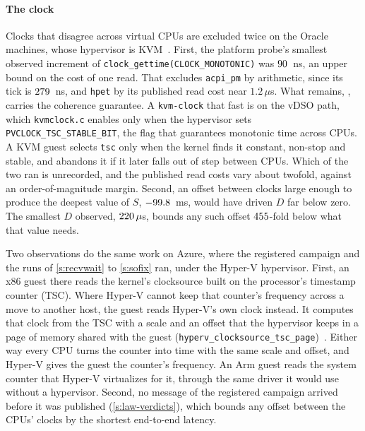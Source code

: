 \documentclass[10pt,journal,onecolumn]{IEEEtran}
\begin{document}
\paragraph{The clock} Clocks that disagree across virtual CPUs are excluded twice on the Oracle
machines, whose hypervisor is KVM~\cite{kvmclock}. First, the platform probe's smallest observed
increment of \texttt{clock\_gettime(CLOCK\_MONOTONIC)} was $90$~ns, an upper bound on the cost of
one read. That excludes \texttt{acpi\_pm} by arithmetic, since its tick is $279$~ns,
and \texttt{hpet} by its published read cost near $1.2\,\mu$s. What remains, \clockAdmitted{},
carries the coherence guarantee. A \texttt{kvm-clock} that fast is on the vDSO path, which
\texttt{kvmclock.c} enables only when the hypervisor sets \texttt{PVCLOCK\_TSC\_STABLE\_BIT}, the
flag that guarantees monotonic time across CPUs. A KVM guest selects \texttt{tsc} only when the kernel finds it
constant, non-stop and stable, and abandons it if it later falls out of step between CPUs. Which
of the two ran is unrecorded, and the published read costs vary about twofold, against an
order-of-magnitude margin. Second, an offset between clocks large enough to produce the deepest
value of $S$, $-99.8$~ms, would have driven $D$ far below zero. The smallest $D$
observed, $220\,\mu$s, bounds any such offset $455$-fold below what that
value needs.

Two observations do the same work on Azure, where the registered campaign and the runs of
\ref{s:recvwait} to \ref{s:sofix} ran, under the Hyper-V hypervisor. First, an x86 guest there
reads the kernel's clocksource built on the processor's timestamp counter (TSC). Where Hyper-V
cannot keep that counter's frequency across a move to another host, the guest reads Hyper-V's own
clock instead. It computes that clock from the TSC with a scale and an offset that the hypervisor
keeps in a page of memory shared with the guest
(\texttt{hyperv\_clocksource\_tsc\_page})~\cite{linux_hyperv_clocks}. Either way every CPU turns
the counter into time with the same scale and offset, and Hyper-V gives the guest the counter's
frequency. An Arm guest reads the system counter that Hyper-V virtualizes for it, through the
same driver it would use without a hypervisor. Second, no message of the registered campaign
arrived before it was published (\ref{s:law-verdicts}), which bounds any offset between the CPUs'
clocks by the shortest end-to-end latency.
\end{document}
